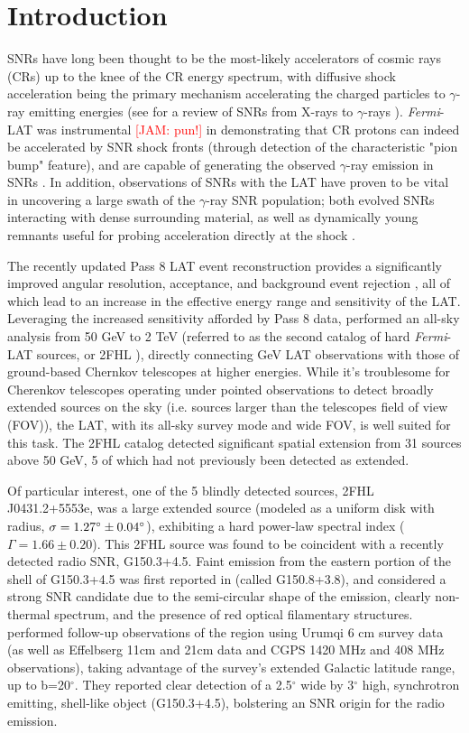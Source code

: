 \documentclass[iop]{emulateapj}
\newcommand{\kibitz}[2]{\ifnum\Comments=1\textcolor{#1}{#2}\fi}
\newcommand{\jamie}[1]{\kibitz{red}      {[JAM: #1]}}
\newcommand{\gam}{$\gamma$-ray}
\newcommand{\Fermi}{\emph{Fermi}}  %
\newcommand{\Gone}{G150.3+4.5}
\begin{document}
\section{Introduction} 
SNRs have long been thought to be the most-likely accelerators of cosmic rays (CRs) up to the knee of the CR energy spectrum, with diffusive shock acceleration being the primary mechanism accelerating the charged particles to \gam{} emitting energies (see \cite{Reynolds08} for a review of  SNRs from X-rays to \gam{}s ). \Fermi{}-LAT was instrumental \jamie{pun!} in demonstrating that CR protons can indeed be accelerated by SNR shock fronts (through detection of the characteristic "pion bump" feature), and are capable of generating the observed \gam{} emission in SNRs \citep{W44pion, Jogler16}. In addition, observations of SNRs with the LAT have proven to be vital in uncovering a large swath of the \gam{} SNR population; both evolved SNRs interacting with dense surrounding material, as well as dynamically young remnants useful for probing acceleration directly at the shock \citep{snrCat}. 

The  recently updated Pass 8 LAT event reconstruction provides a significantly improved angular resolution,  acceptance, and background event rejection \citep{atwood13b,atwood13}, all of which lead to an increase in the effective energy range and sensitivity of the LAT. Leveraging the increased sensitivity afforded by Pass 8 data, \cite{2FHL} performed an all-sky analysis from 50 GeV to 2 TeV (referred to as the second catalog of hard \Fermi{}-LAT sources, or 2FHL ), directly connecting GeV LAT observations  with those of ground-based Chernkov telescopes at higher energies. While it's troublesome for Cherenkov telescopes operating under pointed observations to detect broadly extended sources on the sky (i.e. sources larger than the telescopes field of view (FOV)), the LAT, with its all-sky survey mode and wide FOV, is well suited for this task. The 2FHL catalog detected significant spatial extension from 31 sources above 50 GeV, 5 of which had not previously been detected as extended.

Of particular interest, one of the 5 blindly detected sources, 2FHL J0431.2+5553e, was a large extended source  (modeled as a uniform disk with radius, ${\rm \sigma = 1.27^\circ \pm 0.04^\circ}$), exhibiting a hard power-law spectral index ($\Gamma = 1.66 \pm 0.20$). This 2FHL source was found to be coincident with a recently detected radio SNR, \Gone{}. Faint emission from the eastern portion of the shell of \Gone{} was first reported in \cite{Gerbrandt14} (called G150.8+3.8), and considered a strong SNR candidate due to the semi-circular shape of the emission, clearly non-thermal spectrum, and the presence of red optical filamentary structures. \cite{Gao14} performed follow-up observations of the region using Urumqi 6 cm survey data (as well as Effelbserg 11cm and 21cm data and CGPS 1420 MHz and 408 MHz observations), taking advantage of the survey's extended Galactic latitude range, up to b=20$^\circ$. They reported clear detection of a 2.5$^\circ$ wide by 3$^\circ$ high, synchrotron emitting, shell-like object (\Gone{}),  bolstering an SNR origin for the radio emission.
\end{document}
